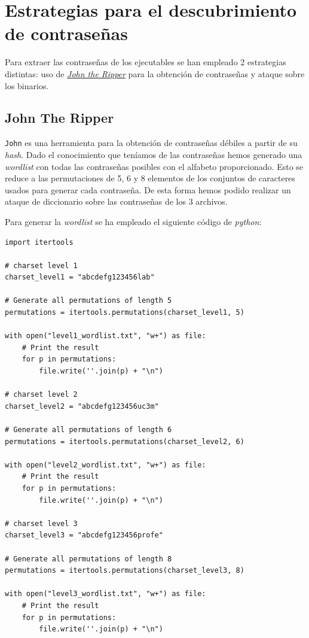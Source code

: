 \documentclass[]{article}
\begin{document}
\section{Estrategias para el descubrimiento de contraseñas}
\label{sec:password}

Para extraer las contraseñas de los ejecutables se han empleado 2 estrategias distintas: uso de \href{https://www.openwall.com/john/}{\textit{John the Ripper}} para la obtención de contraseñas y ataque sobre los binarios.

\subsection{John The Ripper}
\label{sec:john}

\texttt{John} es una herramienta para la obtención de contraseñas débiles a partir de su \textit{hash}. Dado el conocimiento que teníamos de las contraseñas hemos generado una \textit{wordlist} con todas las contraseñas posibles con el alfabeto proporcionado. Esto se reduce a las permutaciones de 5, 6 y 8 elementos de los conjuntos de caracteres usados para generar cada contraseña. De esta forma hemos podido realizar un ataque de diccionario sobre las contraseñas de los 3 archivos. 

Para generar la \textit{wordlist} se ha empleado el siguiente código de \textit{python}:

\lstset{style=python}
\begin{lstlisting}[caption=Script para la generación de \textit{wordlists}]
import itertools

# charset level 1
charset_level1 = "abcdefg123456lab"

# Generate all permutations of length 5
permutations = itertools.permutations(charset_level1, 5)

with open("level1_wordlist.txt", "w+") as file:
    # Print the result
    for p in permutations:
        file.write(''.join(p) + "\n")
        
# charset level 2
charset_level2 = "abcdefg123456uc3m"

# Generate all permutations of length 6
permutations = itertools.permutations(charset_level2, 6)

with open("level2_wordlist.txt", "w+") as file:
    # Print the result
    for p in permutations:
        file.write(''.join(p) + "\n")

# charset level 3
charset_level3 = "abcdefg123456profe"

# Generate all permutations of length 8
permutations = itertools.permutations(charset_level3, 8)

with open("level3_wordlist.txt", "w+") as file:
    # Print the result
    for p in permutations:
        file.write(''.join(p) + "\n")

\end{lstlisting}
\end{document}
